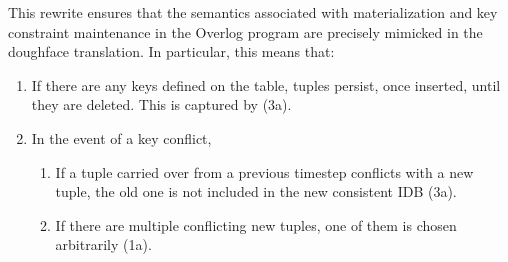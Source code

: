 This rewrite ensures that the semantics associated with materialization and key constraint maintenance in the Overlog program are precisely mimicked in the doughface translation. In particular, this means that:

\begin{enumerate}
\item If there are any keys defined on the table, tuples persist, once inserted, until they are deleted. This is captured by (3a).
\item In the event of a key conflict,
\begin{enumerate}
	\item If a tuple carried over from a previous timestep conflicts with a new tuple, the old one is not included in the new consistent IDB (3a).
	\item If there are multiple conflicting new tuples, one of them is chosen arbitrarily (1a).
\end{enumerate}
\end{enumerate}
